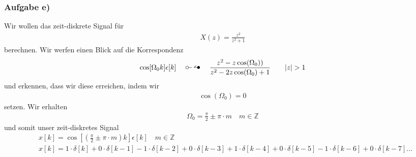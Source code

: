\documentclass[11pt,a4paper,DIV=12]{scrartcl}
\begin{document}
\subsubsection{Aufgabe e)}
\label{sec:taske1}
Wir wollen das zeit-diskrete Signal für
\begin{align}
	X(z)=\frac{z^2}{z^2+1}
\end{align}
berechnen.
Wir werfen einen Blick auf die Korrespondenz
\begin{align}
	\cos [\Omega_0k]\epsilon[k]\quad\ztransf\quad \frac{z^2-z\cos(\Omega_0))}{z^2-2z\cos(\Omega_0)+1}\quad\quad |z| > 1
\end{align}
und erkennen, dass wir diese erreichen, indem wir
\begin{align}
	\cos(\Omega_0)=0
\end{align}
setzen.
Wir erhalten
\begin{align}
	\Omega_0 = \frac{\pi}{2} \pm \pi \cdot m \quad m \in \mathbb{Z}
\end{align}
und somit unser zeit-diskretes Signal
\begin{align}
	&x[k]=\cos[(\frac{\pi}{2}\pm \pi\cdot m)k]\epsilon[k]\quad m \in \mathbb{Z}\\
	&x[k] = 1\cdot\delta[k] + 0\cdot \delta[k-1] -1\cdot \delta[k-2] + 0\cdot \delta[k-3] + 1\cdot \delta[k-4] + 0\cdot \delta[k-5] -1\cdot \delta[k-6] + 0\cdot \delta[k-7] ...
\end{align}
\end{document}
